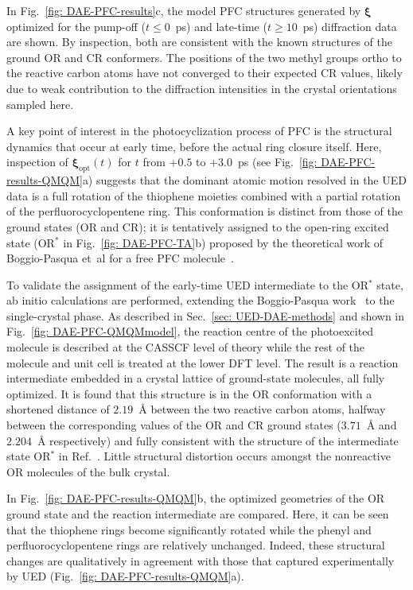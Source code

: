 In Fig.~\ref{fig: DAE-PFC-results}c, the model PFC structures
generated by $\boldsymbol{\xi}$ optimized for the pump-off ($t \leq 0$~ps)
and late-time ($t \geq 10$~ps) diffraction data are shown.
By inspection, both are consistent with the known structures of
the ground OR and CR conformers.
%
The positions of the two methyl groups ortho to the reactive carbon atoms
have not converged to their expected CR values, likely due to
weak contribution to the diffraction intensities in the crystal orientations sampled here.

A key point of interest in the photocyclization process of PFC is
the structural dynamics that occur at early time,
before the actual ring closure itself.
%
Here, inspection of $\boldsymbol{\xi}_\mathrm{opt}(t)$ for $t$ from $+0.5$ to $+3.0$~ps
(see Fig.~\ref{fig: DAE-PFC-results-QMQM}a) suggests that
the dominant atomic motion resolved in the UED data is
a full rotation of the thiophene moieties combined with
a partial rotation of the perfluorocyclopentene ring.
%
This conformation is distinct from those of the ground states (OR and CR);
it is tentatively assigned to the open-ring excited state (OR$^*$ in Fig.~\ref{fig: DAE-PFC-TA}b)
proposed by the theoretical work of Boggio-Pasqua et~al
for a free PFC molecule~\cite{Boggio2003}.

To validate the assignment of the early-time UED intermediate to
the OR$^*$ state, ab initio calculations are performed,
extending the Boggio-Pasqua work~\cite{Boggio2003} to the single-crystal phase.
%
As described in Sec.~\ref{sec: UED-DAE-methods} and shown in Fig.~\ref{fig: DAE-PFC-QMQMmodel},
the reaction centre of the photoexcited molecule is described at the CASSCF level of theory
while the rest of the molecule and unit cell is treated at the lower DFT level.
The result is a reaction intermediate embedded in a crystal lattice of ground-state molecules,
all fully optimized.
%
It is found that this structure is in the OR conformation with a shortened distance of $2.19$~\AA{}
between the two reactive carbon atoms, halfway between the corresponding values of the OR and CR ground states
($3.71$~\AA{} and $2.204$~\AA{} respectively) and fully consistent with
the structure of the intermediate state OR$^*$ in Ref.~\cite{Boggio2003}.
%
Little structural distortion occurs amongst the nonreactive OR molecules of the bulk crystal.

In Fig.~\ref{fig: DAE-PFC-results-QMQM}b,
the optimized geometries of the OR ground state and the reaction intermediate are compared.
Here, it can be seen that the thiophene rings become significantly rotated
while the phenyl and perfluorocyclopentene rings are relatively unchanged.
Indeed, these structural changes are qualitatively in agreement with
those that captured experimentally by UED (Fig.~\ref{fig: DAE-PFC-results-QMQM}a).

